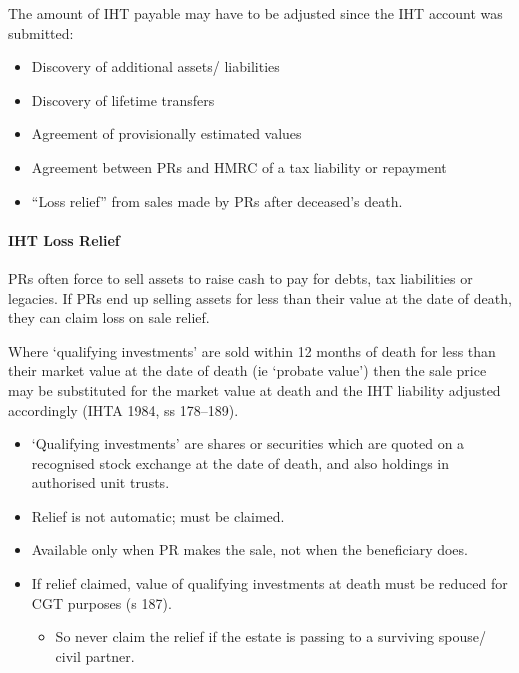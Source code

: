 \documentclass[
]{article}
\newenvironment{Shaded}{}{}
\newcommand{\NormalTok}[1]{#1}
\providecommand{\tightlist}{%
  \setlength{\itemsep}{0pt}\setlength{\parskip}{0pt}}
\begin{document}
The amount of IHT payable may have to be adjusted since the IHT account
was submitted:

\begin{itemize}
\tightlist
\item
  Discovery of additional assets/ liabilities
\item
  Discovery of lifetime transfers
\item
  Agreement of provisionally estimated values
\item
  Agreement between PRs and HMRC of a tax liability or repayment
\item
  ``Loss relief'' from sales made by PRs after deceased's death.
\end{itemize}

\hypertarget{iht-loss-relief}{%
\paragraph{IHT Loss Relief}\label{iht-loss-relief}}

PRs often force to sell assets to raise cash to pay for debts, tax
liabilities or legacies. If PRs end up selling assets for less than
their value at the date of death, they can claim loss on sale relief.

\begin{Shaded}
\begin{Highlighting}[]
\NormalTok{Where ‘qualifying investments’ are sold within 12 months of death for less than their market value at the date of death (ie ‘probate value’) then the sale price may be substituted for the market value at death and the IHT liability adjusted accordingly (IHTA 1984, ss 178–189).}
\end{Highlighting}
\end{Shaded}

\begin{itemize}
\tightlist
\item
  `Qualifying investments' are shares or securities which are quoted on
  a recognised stock exchange at the date of death, and also holdings in
  authorised unit trusts.
\item
  Relief is not automatic; must be claimed.
\item
  Available only when PR makes the sale, not when the beneficiary does.
\item
  If relief claimed, value of qualifying investments at death must be
  reduced for CGT purposes (s 187).

  \begin{itemize}
  \tightlist
  \item
    So never claim the relief if the estate is passing to a surviving
    spouse/ civil partner.
  \end{itemize}
\end{itemize}
\end{document}
